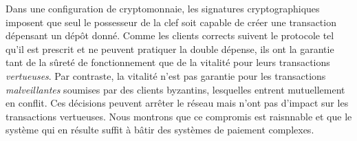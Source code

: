 \documentclass[letterpaper,twocolumn,10pt]{article}
\theoremstyle{definition}
\begin{document}
Dans une configuration de cryptomonnaie, les signatures cryptographiques imposent que seul le possesseur de la clef soit capable de créer une transaction dépensant un dépôt donné. Comme les clients corrects suivent le protocole tel qu'il est prescrit et ne peuvent pratiquer la double dépense, ils ont la garantie tant de la sûreté de fonctionnement que de la vitalité pour leurs transactions \emph{vertueuses}. Par contraste, la vitalité n'est pas garantie pour les transactions \emph{malveillantes} soumises par des clients byzantins, lesquelles entrent mutuellement en conflit. Ces décisions peuvent arrêter le réseau mais n'ont pas d'impact sur les transactions vertueuses.
Nous montrons que ce compromis est raisnnable et que le système qui en résulte suffit à bâtir des systèmes de paiement complexes.



\end{document}
